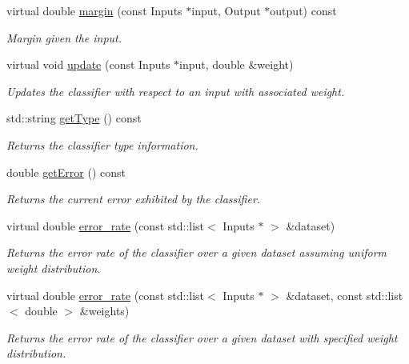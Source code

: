\begin{DoxyCompactItemize}
virtual double \hyperlink{classiCub_1_1boostMIL_1_1AvgClassifier_a9b4b32754ae278c07406da91ddc0ece7}{margin} (const Inputs $\ast$input, Output $\ast$output) const 
\begin{DoxyCompactList}\small\item\em Margin given the input. \end{DoxyCompactList}\item 
virtual void \hyperlink{classiCub_1_1boostMIL_1_1AvgClassifier_ab6da9e17e44ee65c40b854b2d4ff4a52}{update} (const Inputs $\ast$input, double \&weight)
\begin{DoxyCompactList}\small\item\em Updates the classifier with respect to an input with associated weight. \end{DoxyCompactList}\item 
std\+::string \hyperlink{classiCub_1_1boostMIL_1_1WeakClassifier_aa5de990b0baac11f35f74493ca853ac5}{get\+Type} () const 
\begin{DoxyCompactList}\small\item\em Returns the classifier type information. \end{DoxyCompactList}\item 
double \hyperlink{classiCub_1_1boostMIL_1_1WeakClassifier_a525811a7380bcfd3cbc1edbe90e0842a}{get\+Error} () const 
\begin{DoxyCompactList}\small\item\em Returns the current error exhibited by the classifier. \end{DoxyCompactList}\item 
virtual double \hyperlink{classiCub_1_1boostMIL_1_1WeakClassifier_a8f9de230214c99305df65010e5ddbe77}{error\+\_\+rate} (const std\+::list$<$ Inputs $\ast$ $>$ \&dataset)
\begin{DoxyCompactList}\small\item\em Returns the error rate of the classifier over a given dataset assuming uniform weight distribution. \end{DoxyCompactList}\item 
virtual double \hyperlink{classiCub_1_1boostMIL_1_1WeakClassifier_a294f03d21af03a5f96875562a5a979a0}{error\+\_\+rate} (const std\+::list$<$ Inputs $\ast$ $>$ \&dataset, const std\+::list$<$ double $>$ \&weights)
\begin{DoxyCompactList}\small\item\em Returns the error rate of the classifier over a given dataset with specified weight distribution. \end{DoxyCompactList}\end{DoxyCompactItemize}
